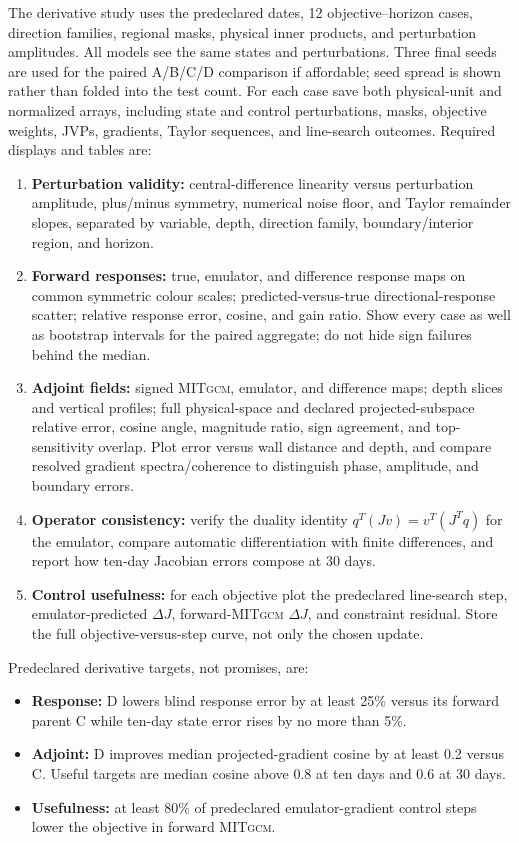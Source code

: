 \documentclass[11pt]{article}
\newcommand{\MITgcm}{\textsc{MITgcm}}
\begin{document}
The derivative study uses the predeclared dates, 12 objective--horizon cases, direction
families, regional masks, physical inner products, and perturbation amplitudes.  All
models see the same states and perturbations.  Three final seeds are used for the paired
A/B/C/D comparison if affordable; seed spread is shown rather than folded into the test
count.  For each case save both physical-unit and normalized arrays, including state and
control perturbations, masks, objective weights, JVPs, gradients, Taylor sequences, and
line-search outcomes.  Required displays and tables are:
\begin{enumerate}
\item \textbf{Perturbation validity:} central-difference linearity versus perturbation
  amplitude, plus/minus symmetry, numerical noise floor, and Taylor remainder slopes,
  separated by variable, depth, direction family, boundary/interior region, and horizon.
\item \textbf{Forward responses:} true, emulator, and difference response maps on common
  symmetric colour scales; predicted-versus-true directional-response scatter; relative
  response error, cosine, and gain ratio.  Show every case as well as bootstrap intervals
  for the paired aggregate; do not hide sign failures behind the median.
\item \textbf{Adjoint fields:} signed \MITgcm{}, emulator, and difference maps; depth
  slices and vertical profiles; full physical-space and declared projected-subspace
  relative error, cosine angle, magnitude ratio, sign agreement, and top-sensitivity
  overlap.  Plot error versus wall distance and depth, and compare resolved gradient
  spectra/coherence to distinguish phase, amplitude, and boundary errors.
\item \textbf{Operator consistency:} verify the duality identity
  $q^T(Jv)=v^T(J^Tq)$ for the emulator, compare automatic differentiation with finite
  differences, and report how ten-day Jacobian errors compose at 30 days.
\item \textbf{Control usefulness:} for each objective plot the predeclared line-search
  step, emulator-predicted $\Delta J$, forward-\MITgcm{} $\Delta J$, and constraint
  residual.  Store the full objective-versus-step curve, not only the chosen update.
\end{enumerate}

Predeclared derivative targets, not promises, are:
\begin{itemize}
\item \textbf{Response:} D lowers blind response error by at least 25\% versus its
forward parent C while ten-day state error rises by no more than 5\%.
\item \textbf{Adjoint:} D improves median projected-gradient cosine by at least 0.2
versus C.
Useful targets are median cosine above 0.8 at ten days and 0.6 at 30 days.
\item \textbf{Usefulness:} at least 80\% of predeclared emulator-gradient control steps
lower the objective in forward \MITgcm{}.
\end{itemize}
\end{document}
